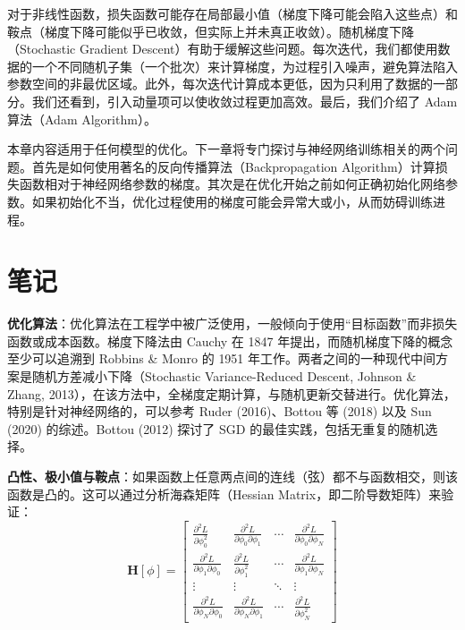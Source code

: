 \documentclass[lang=cn,newtx,10pt,scheme=chinese]{elegantbook}
\begin{document}
对于非线性函数，损失函数可能存在局部最小值（梯度下降可能会陷入这些点）和鞍点（梯度下降可能似乎已收敛，但实际上并未真正收敛）。随机梯度下降（Stochastic Gradient Descent）有助于缓解这些问题。每次迭代，我们都使用数据的一个不同随机子集（一个批次）来计算梯度，为过程引入噪声，避免算法陷入参数空间的非最优区域。此外，每次迭代计算成本更低，因为只利用了数据的一部分。我们还看到，引入动量项可以使收敛过程更加高效。最后，我们介绍了 Adam 算法（Adam Algorithm）。

本章内容适用于任何模型的优化。下一章将专门探讨与神经网络训练相关的两个问题。首先是如何使用著名的反向传播算法（Backpropagation Algorithm）计算损失函数相对于神经网络参数的梯度。其次是在优化开始之前如何正确初始化网络参数。如果初始化不当，优化过程使用的梯度可能会异常大或小，从而妨碍训练进程。

\section{笔记}
\textbf{优化算法}：优化算法在工程学中被广泛使用，一般倾向于使用“目标函数”而非损失函数或成本函数。梯度下降法由 Cauchy 在 1847 年提出，而随机梯度下降的概念至少可以追溯到 Robbins \& Monro 的 1951 年工作。两者之间的一种现代中间方案是随机方差减小下降（Stochastic Variance-Reduced Descent, Johnson \& Zhang, 2013），在该方法中，全梯度定期计算，与随机更新交替进行。优化算法，特别是针对神经网络的，可以参考 Ruder (2016)、Bottou 等 (2018) 以及 Sun (2020) 的综述。Bottou (2012) 探讨了 SGD 的最佳实践，包括无重复的随机选择。

\textbf{凸性、极小值与鞍点}：如果函数上任意两点间的连线（弦）都不与函数相交，则该函数是凸的。这可以通过分析海森矩阵（Hessian Matrix，即二阶导数矩阵）来验证：
\begin{equation}
\mathbf{H}[\phi] = 
\begin{bmatrix}
\frac{\partial^2 L}{\partial \phi_0^2} & \frac{\partial^2 L}{\partial \phi_0 \partial \phi_1} & \cdots & \frac{\partial^2 L}{\partial \phi_0 \partial \phi_N} \\
\frac{\partial^2 L}{\partial \phi_1 \partial \phi_0} & \frac{\partial^2 L}{\partial \phi_1^2} & \cdots & \frac{\partial^2 L}{\partial \phi_1 \partial \phi_N} \\
\vdots & \vdots & \ddots & \vdots \\
\frac{\partial^2 L}{\partial \phi_N \partial \phi_0} & \frac{\partial^2 L}{\partial \phi_N \partial \phi_1} & \cdots & \frac{\partial^2 L}{\partial \phi_N^2}
\end{bmatrix}	
\end{equation}
\end{document}

